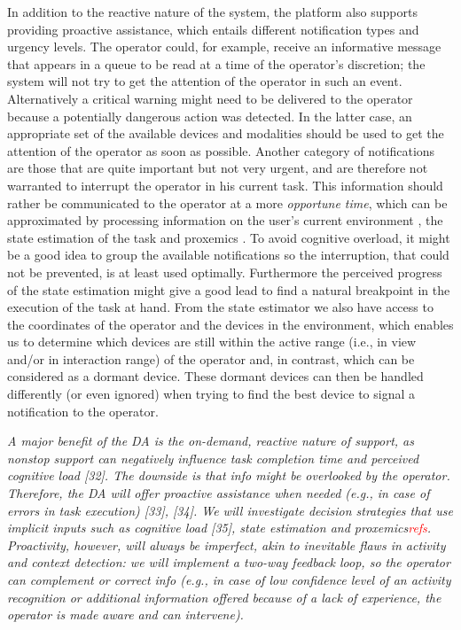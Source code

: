 In addition to the reactive nature of the system, the platform also supports providing proactive assistance, which entails different notification types and urgency levels. 
The operator could, for example, receive an informative message that appears in a queue to be read at a time of the operator's discretion; the system will not try to get the attention of the operator in such an event. 
Alternatively a critical warning might need to be delivered to the operator because a potentially dangerous action was detected. In the latter case, an appropriate set of the available devices and modalities should be used to get the attention of the operator as soon as possible.
Another category of notifications are those that are quite important but not very urgent, and are therefore not warranted to interrupt the operator in his current task. This information should rather be communicated to the operator at a more \textit{opportune time}, which can be approximated by processing information on the user’s current environment \cite{lindlbauer2019ContextAwareOnlineAdaptation}, the state estimation of the task and proxemics \cite{Marquardt_2015} \cite{Williamson_2022}. 
To avoid cognitive overload, it might be a good idea to group the available notifications so the interruption, that could not be prevented, is at least used optimally.
Furthermore the perceived progress of the state estimation might give a good lead to find a natural breakpoint in the execution of the task at hand.
From the state estimator we also have access to the coordinates of the operator and the devices in the environment, which enables us to determine which devices are still within the active range (i.e., in view and/or in interaction range) of the operator and, in contrast, which can be considered as a dormant device. These dormant devices can then be handled differently (or even ignored) when trying to find the best device to signal a notification to the operator.

\iffalse
\textit{A major benefit of the DA is the on-demand, reactive nature of support, as nonstop support can negatively influence task completion time and perceived cognitive load [32]. The downside is that info might be overlooked by the operator. Therefore, the DA will offer proactive assistance when needed (e.g., in case of errors in task execution) [33], [34]. We will investigate decision strategies that use implicit inputs such as cognitive load [35], state estimation and proxemics\textcolor{red}{refs}. 
Proactivity, however, will always be imperfect, akin to inevitable flaws in activity and context detection: we will implement a two-way feedback loop, so the operator can complement or correct info (e.g., in case of low confidence level of an activity recognition or additional information offered because of a lack of experience, the operator is made aware and can intervene). }

